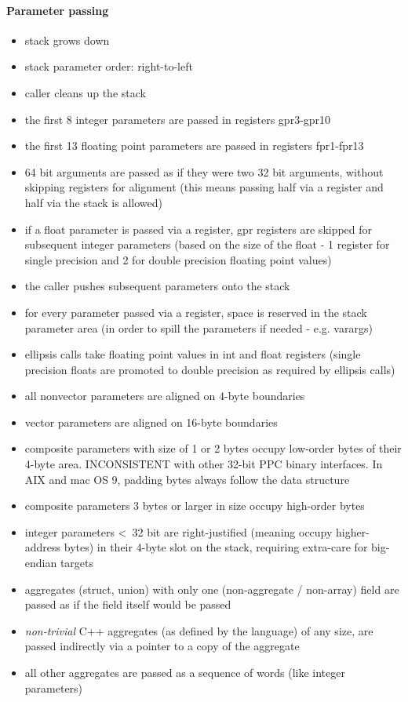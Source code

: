 \paragraph{Parameter passing}

\begin{itemize}
\item stack grows down
\item stack parameter order: right-to-left
\item caller cleans up the stack
\item the first 8 integer parameters are passed in registers gpr3-gpr10
\item the first 13 floating point parameters are passed in registers fpr1-fpr13
\item 64 bit arguments are passed as if they were two 32 bit arguments, without skipping registers for alignment (this means passing half via a register and half via the stack is allowed)
\item if a float parameter is passed via a register, gpr registers are skipped for subsequent integer parameters (based on the size of
the float - 1 register for single precision and 2 for double precision floating point values)
\item the caller pushes subsequent parameters onto the stack
\item for every parameter passed via a register, space is reserved in the stack parameter area (in order to spill the parameters if
needed - e.g. varargs)
\item ellipsis calls take floating point values in int and float registers (single precision floats are promoted to double precision as
required by ellipsis calls)
\item all nonvector parameters are aligned on 4-byte boundaries
\item vector parameters are aligned on 16-byte boundaries
\item composite parameters with size of 1 or 2 bytes occupy low-order bytes of their 4-byte area. INCONSISTENT with other 32-bit PPC
binary interfaces. In AIX and mac OS 9, padding bytes always follow the data structure
\item composite parameters 3 bytes or larger in size occupy high-order bytes
\item integer parameters \textless\ 32 bit are right-justified (meaning occupy higher-address bytes) in their 4-byte slot on the stack, requiring extra-care for big-endian targets
\item aggregates (struct, union) with only one (non-aggregate / non-array) field are passed as if the field itself would be passed
\item {\it non-trivial} C++ aggregates (as defined by the language) of any size, are passed indirectly via a pointer to a copy of the aggregate
\item all other aggregates are passed as a sequence of words (like integer parameters)
\end{itemize}


